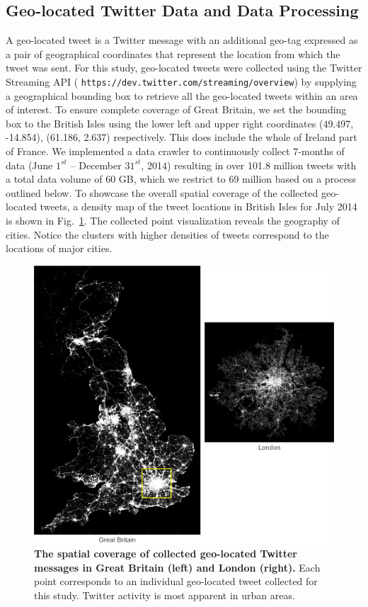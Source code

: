 \documentclass[]{tGIS2e}
\begin{document}
{\subsection{Geo-located Twitter Data and Data Processing}
A geo-located tweet is a Twitter message with an additional geo-tag expressed as a pair of geographical coordinates that represent the location from which the tweet was sent.
For this study, geo-located tweets were collected using the Twitter Streaming API (
{\tt{https://dev.twitter.com/streaming/overview}}) by supplying a geographical bounding box to retrieve all the  geo-located tweets within an area of interest. To ensure complete coverage of Great Britain, we set the bounding box to the British Isles using the lower left and upper right coordinates (49.497, -14.854), (61.186, 2.637) respectively. This does include the whole of Ireland part of France.
We implemented a data crawler to continuously collect 7-months of data (June $1^{st}$ -- December $31^{st}$, 2014) resulting in over 101.8 million tweets with a total data volume of 60 GB, which we restrict to 69 million based on a process outlined below. 
To showcase the overall spatial coverage of the collected geo-located tweets, a density map of the tweet locations in British Isles for July 2014 is shown in Fig.~\ref{S2_Fig}.
The collected point visualization reveals the geography of cities.
Notice the clusters with higher densities of tweets correspond to the locations of major cities.

\begin{figure}[ht]
\begin{center}
\includegraphics[width=1.0\linewidth]{./figure/S2_twitter_density_Fig_1}
\caption{{\bf The spatial coverage of collected geo-located Twitter messages in Great Britain (left) and London (right).} Each point corresponds to an individual geo-located tweet collected for this study. Twitter activity is most apparent in urban areas.}
\label{S2_Fig}
\end{center}
\end{figure}

}
\end{document}
